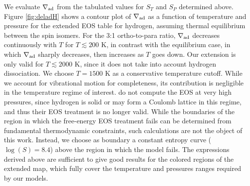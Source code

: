 \begin{enumerate}
We evaluate $\nabla_{\rm ad}$ from the tabulated values for $S_T$ and $S_P$ determined above. Figure \ref{fig:deladH} shows a contour plot of $\nabla_{\rm ad}$ as a function of temperature and pressure for the extended EOS table for hydrogen, assuming thermal equilibrium between the spin isomers. For the 3:1 ortho-to-para ratio, $\nabla_{\rm ad}$ decreases continuously with $T$ for $T \lesssim 200$ K, in contrast with the equilibrium case, in which $\nabla_{\rm ad}$ sharply decreases, then increases as $T$ goes down. Our extension is only valid for $T \lesssim 2000$ K, since it does not take into account hydrogen dissociation. We choose $T=1500$ K as a conservative temperature cutoff. While we account for vibrational motion for completeness, its contribution is negligible in the temperature regime of interest. \citet{saumon95} do not compute the EOS at very high pressures, since hydrogen is solid or may form a Coulomb lattice in this regime, and thus their EOS treatment is no longer valid. While the boundaries of the region in which the free-energy EOS treatment fails can be determined from fundamental thermodynamic constraints, such calculations are not the object of this work. Instead, we choose as boundary a constant entropy curve ($\log(S)=8.4$) above the region in which the \citet{saumon95} model fails. The expressions derived above are sufficient to give good results for the colored regions of the extended map, which fully cover the temperature and pressures ranges required by our models.


\end{enumerate}

